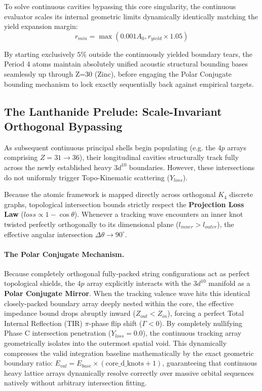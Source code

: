 To solve continuous cavities bypassing this core singularity, the continuous evaluator scales its internal geometric limits dynamically identically matching the yield expansion margin:
\begin{equation}
    r_{min} = \max(0.001 A_0, r_{yield} \times 1.05)
\end{equation}

By starting exclusively $5\%$ outside the continuously yielded boundary tears, the Period 4 atoms maintain absolutely unified acoustic structural bounding bases seamlessly up through Z=30 (Zinc), before engaging the Polar Conjugate bounding mechanism to lock exactly sequentially back against empirical targets.

\subsection{The Lanthanide Prelude: Scale-Invariant Orthogonal Bypassing}
As subsequent continuous principal shells begin populating (e.g. the $4p$ arrays comprising $Z=31 \to 36$), their longitudinal cavities structurally track fully across the newly established heavy $3d^{10}$ boundaries. However, these intersections do not uniformly trigger Topo-Kinematic scattering ($Y_{loss}$).

Because the atomic framework is mapped directly across orthogonal $K_4$ discrete graphs, topological intersection bounds strictly respect the \textbf{Projection Loss Law} ($loss \propto 1 - \cos\theta$). Whenever a tracking wave encounters an inner knot twisted perfectly orthogonally to its dimensional plane ($l_{inner} > l_{outer}$), the effective angular intersection $\Delta\theta \to 90^\circ$. 

\paragraph{The Polar Conjugate Mechanism.}
Because completely orthogonal fully-packed string configurations act as perfect topological shields, the $4p$ array explicitly interacts with the $3d^{10}$ manifold as a \textbf{Polar Conjugate Mirror}. When the tracking valence wave hits this identical closely-packed boundary array deeply nested within the core, the effective impedance bound drops abruptly inward ($Z_{out} < Z_{in}$), forcing a perfect Total Internal Reflection (TIR) $\pi$-phase flip shift ($\Gamma < 0$).
By completely nullifying Phase C intersection penetration ($Y_{loss} = 0.0$), the continuous tracking array geometrically isolates into the outermost spatial void. This dynamically compresses the valid integration baseline mathematically by the exact geometric boundary ratio: $E_{val} = E_{base} \times (\text{core\_d\_knots} + 1)$, guaranteeing that continuous heavy lattice arrays dynamically resolve correctly over massive orbital sequences natively without arbitrary intersection fitting.

